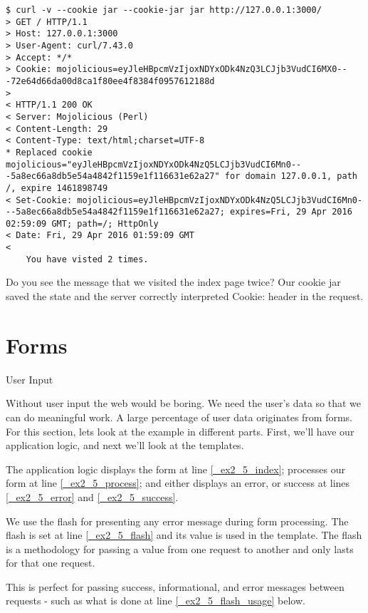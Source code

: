 \documentclass[14pt]{extreport}
\begin{document}
\begin{lstlisting}[style=BashOutputStyle]
$ curl -v --cookie jar --cookie-jar jar http://127.0.0.1:3000/
> GET / HTTP/1.1
> Host: 127.0.0.1:3000
> User-Agent: curl/7.43.0
> Accept: */*
> Cookie: mojolicious=eyJleHBpcmVzIjoxNDYxODk4NzQ3LCJjb3VudCI6MX0---72e64d66da00d8ca1f80ee4f8384f0957612188d
> 
< HTTP/1.1 200 OK
< Server: Mojolicious (Perl)
< Content-Length: 29
< Content-Type: text/html;charset=UTF-8
* Replaced cookie mojolicious="eyJleHBpcmVzIjoxNDYxODk4NzQ5LCJjb3VudCI6Mn0---5a8ec66a8db5e54a4842f1159e1f116631e62a27" for domain 127.0.0.1, path /, expire 1461898749
< Set-Cookie: mojolicious=eyJleHBpcmVzIjoxNDYxODk4NzQ5LCJjb3VudCI6Mn0---5a8ec66a8db5e54a4842f1159e1f116631e62a27; expires=Fri, 29 Apr 2016 02:59:09 GMT; path=/; HttpOnly
< Date: Fri, 29 Apr 2016 01:59:09 GMT
< 
    You have visted 2 times.
\end{lstlisting}

Do you see the message that we visited the index page twice?  Our cookie jar
saved the state and the server correctly interpreted Cookie: header in the
request.

\section{Forms}

{\Large User Input}

Without user input the web would be boring.  We need the user's data so that we
can do meaningful work.  A large percentage of user data originates from forms.
For this section, lets look at the example in different parts.  First, we'll
have our application logic, and next we'll look at the templates.

The application logic displays the form at line \ref{_ex2_5_index}; processes
our form at line \ref{_ex2_5_process}; and either displays an error, or success
at lines \ref{_ex2_5_error} and \ref{_ex2_5_success}.



We use the flash for presenting any error message during form processing.  The
flash is set at line \ref{_ex2_5_flash} and its value is used in the template.
The flash is a methodology for passing a value from one request to another and
only lasts for that one request.

This is perfect for passing success, informational, and error messages between
requests - such as what is done at line \ref{_ex2_5_flash_usage} below.
\end{document}
